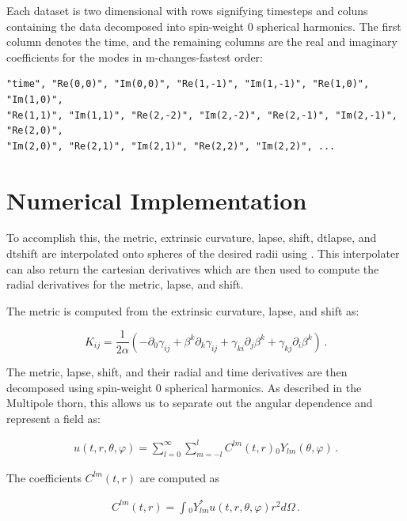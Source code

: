 \documentclass{article}
\begin{document}
Each dataset is two dimensional with rows signifying timesteps and coluns containing the data decomposed into spin-weight 0
spherical harmonics. The first column denotes the time, and the remaining columns are the real and imaginary coefficients 
for the modes in m-changes-fastest order:

\begin{verbatim}
"time", "Re(0,0)", "Im(0,0)", "Re(1,-1)", "Im(1,-1)", "Re(1,0)", "Im(1,0)",
"Re(1,1)", "Im(1,1)", "Re(2,-2)", "Im(2,-2)", "Re(2,-1)", "Im(2,-1)", "Re(2,0)",
"Im(2,0)", "Re(2,1)", "Im(2,1)", "Re(2,2)", "Im(2,2)", ...
\end{verbatim}

\section{Numerical Implementation}

To accomplish this, the metric, extrinsic curvature, lapse, shift, dtlapse, and dtshift are interpolated onto spheres
of the desired radii using . This interpolater can also return the cartesian derivatives
which are then used to compute the radial derivatives for the metric, lapse, and shift.

The metric is computed from the extrinsic curvature, lapse, and shift as:

\begin{equation}
K_{ij} = \frac{1}{2 \alpha} \left ( -\partial_0 \gamma_{ij} + \beta^k \partial_k \gamma_{ij} + \gamma_{ki} \partial_j \beta^k + \gamma_{kj} \partial_i \beta^k \right ) \, .
\end{equation}

The metric, lapse, shift, and their radial and time derivatives are then decomposed using spin-weight 0 spherical harmonics.
As described in the Multipole thorn, this allows us to separate out the angular dependence and represent a field as:

\begin{eqnarray}
    u(t, r, \theta, \varphi) = \sum_{l=0}^\infty \sum_{m=-l}^l C^{lm}(t,r) {}_0 Y_{lm}(\theta,\varphi) \, .
\end{eqnarray}
  
The coefficients $C^{lm}(t,r)$ are computed as
  
\begin{eqnarray}
    C^{lm}(t, r) = \int {}_0 Y_{lm}^* u(t, r, \theta, \varphi) r^2 d \Omega \label{eqn:clmint} \, .
\end{eqnarray}
\end{document}
